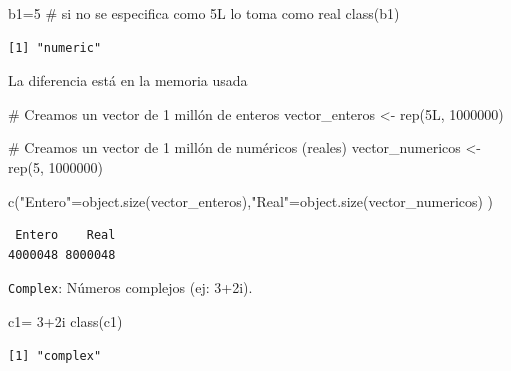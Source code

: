 \documentclass[
  ignorenonframetext,
  aspectratio=169,
  spanish,
]{beamer}
\newenvironment{Shaded}{\begin{snugshade}}{\end{snugshade}}
\newcommand{\CommentTok}[1]{\textcolor[rgb]{0.37,0.37,0.37}{#1}}
\newcommand{\DecValTok}[1]{\textcolor[rgb]{0.68,0.00,0.00}{#1}}
\newcommand{\FunctionTok}[1]{\textcolor[rgb]{0.28,0.35,0.67}{#1}}
\newcommand{\NormalTok}[1]{\textcolor[rgb]{0.00,0.23,0.31}{#1}}
\newcommand{\OtherTok}[1]{\textcolor[rgb]{0.00,0.23,0.31}{#1}}
\newcommand{\SpecialCharTok}[1]{\textcolor[rgb]{0.37,0.37,0.37}{#1}}
\newcommand{\StringTok}[1]{\textcolor[rgb]{0.13,0.47,0.30}{#1}}
\begin{document}
\begin{frame}[fragile]{}
\label{section}
\begin{Shaded}
\begin{Highlighting}[]
\NormalTok{b1}\OtherTok{=}\DecValTok{5} \CommentTok{\# si no se especifica como 5L lo toma como real  }
\FunctionTok{class}\NormalTok{(b1) }
\end{Highlighting}
\end{Shaded}

\begin{verbatim}
[1] "numeric"
\end{verbatim}
\end{frame}

\begin{frame}[fragile]{La diferencia está en la memoria usada}
\label{la-diferencia-estuxe1-en-la-memoria-usada}
\begin{Shaded}
\begin{Highlighting}[]
\CommentTok{\# Creamos un vector de 1 millón de enteros}
\NormalTok{vector\_enteros }\OtherTok{\textless{}{-}} \FunctionTok{rep}\NormalTok{(}\DecValTok{5}\NormalTok{L, }\DecValTok{1000000}\NormalTok{)}

\CommentTok{\# Creamos un vector de 1 millón de numéricos (reales)}
\NormalTok{vector\_numericos }\OtherTok{\textless{}{-}} \FunctionTok{rep}\NormalTok{(}\DecValTok{5}\NormalTok{, }\DecValTok{1000000}\NormalTok{)}

\FunctionTok{c}\NormalTok{(}\StringTok{"Entero"}\OtherTok{=}\FunctionTok{object.size}\NormalTok{(vector\_enteros),}\StringTok{"Real"}\OtherTok{=}\FunctionTok{object.size}\NormalTok{(vector\_numericos) ) }
\end{Highlighting}
\end{Shaded}

\begin{verbatim}
 Entero    Real 
4000048 8000048 
\end{verbatim}
\end{frame}

\begin{frame}[fragile]{}
\label{section-1}
\texttt{Complex}: Números complejos (ej: 3+2i).

\begin{Shaded}
\begin{Highlighting}[]
\NormalTok{c1}\OtherTok{=} \DecValTok{3}\SpecialCharTok{+}\DecValTok{2}\NormalTok{i}
\FunctionTok{class}\NormalTok{(c1) }
\end{Highlighting}
\end{Shaded}

\begin{verbatim}
[1] "complex"
\end{verbatim}
\end{frame}
\end{document}
